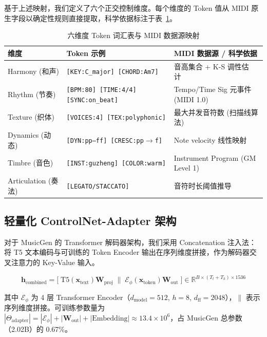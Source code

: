 \documentclass[11pt]{article}
\begin{document}
基于上述映射，我们定义了六个正交控制维度。每个维度的 Token 值从 MIDI 原生字段以确定性规则直接提取，科学依据标注于表~\ref{tab:token_vocab}。

\begin{table}[t]
\centering\small
\caption{六维度 Token 词汇表与 MIDI 数据源映射}
\label{tab:token_vocab}
\begin{tabularx}{\textwidth}{@{}l >{\raggedright\arraybackslash}X >{\raggedright\arraybackslash}X@{}}
\toprule
\textbf{维度} & \textbf{Token 示例} & \textbf{MIDI 数据源 / 科学依据} \\
\midrule
Harmony (和声) & \texttt{[KEY:C\_major] [CHORD:Am7]} & 音高集合 + K-S 调性估计~\cite{krumhansl} \\
Rhythm (节奏) & \texttt{[BPM:80] [TIME:4/4] [SYNC:on\_beat]} & Tempo/Time Sig 元事件 (MIDI 1.0) \\
Texture (织体) & \texttt{[VOICES:4] [TEX:polyphonic]} & 最大并发音符数 (扫描线算法) \\
Dynamics (动态) & \texttt{[DYN:pp--ff] [CRESC:pp$\to$f]} & Note velocity 线性映射~\cite{maestro} \\
Timbre (音色) & \texttt{[INST:guzheng] [COLOR:warm]} & Instrument Program (GM Level 1) \\
Articulation (奏法) & \texttt{[LEGATO/STACCATO]} & 音符时长阈值推导~\cite{groove} \\
\bottomrule
\end{tabularx}
\end{table}

\subsection{轻量化 ControlNet-Adapter 架构}

对于 MusicGen 的 Transformer 解码器架构，我们采用 Concatenation 注入法：将 T5 文本编码与可训练的 Token Encoder 输出在序列维度拼接，作为解码器交叉注意力的 Key-Value 输入。

\begin{equation}
\mathbf{h}_{\text{combined}} = \big[\;\text{T5}(\mathbf{x}_{\text{text}})\mathbf{W}_{\text{proj}}\;\|\;
\mathcal{E}_{\phi}(\mathbf{x}_{\text{token}})\mathbf{W}_{\text{out}}\;\big]
\in \mathbb{R}^{B\times (T_t+T_k)\times 1536}
\end{equation}

其中 $\mathcal{E}_{\phi}$ 为 4 层 Transformer Encoder（$d_{\text{model}}=512$, $h=8$, $d_{\text{ff}}=2048$），$\|$ 表示序列维度拼接。可训练参数量为 $|\Theta_{\text{adapter}}| = |\mathcal{E}_{\phi}| + |\mathbf{W}_{\text{out}}| + |\text{Embedding}| \approx 13.4\times 10^6$，占 MusicGen 总参数（2.02B）的 0.67\%。
\end{document}
